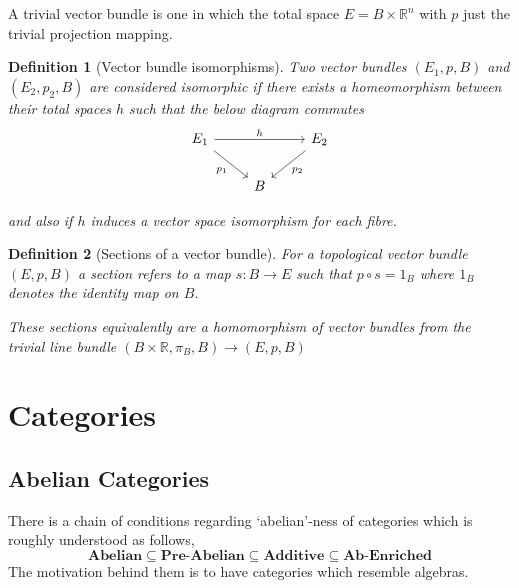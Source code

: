 \documentclass[12pt]{article}
\numberwithin{equation}{section}
\newcommand{\R}{\mathbb{R}}
\newtheorem{definition}{Definition}[section]
\begin{document}
\begin{appendices}
	A trivial vector bundle is one in which the total space $E=B \times \R^n$ with $p$ just the trivial projection mapping.
	
	
	\begin{definition}[Vector bundle isomorphisms]
		Two vector bundles $(E_1,p, B)$ and $(E_2,p_2, B) $ are considered isomorphic if there exists a homeomorphism between their total spaces $h$ such that the below diagram commutes
		\[\begin{tikzcd}
			{E_1} && {E_2} \\
			& B
			\arrow["{p_1}"', from=1-1, to=2-2]
			\arrow["{p_2}", from=1-3, to=2-2]
			\arrow["h", from=1-1, to=1-3]
		\end{tikzcd}\]
		
		and also if $h$ induces a vector space isomorphism for each fibre.
	\end{definition}
	
	\begin{definition}[Sections of a vector bundle]
		For a topological vector bundle $(E,p,B)$ a section refers to a map	$s: B \to E$ such that $p \circ s= 1_B$ where $1_B$ denotes the identity map on $B$.
		
		These sections equivalently are a homomorphism of vector bundles from the trivial line bundle $(B \times \R, \pi_B, B) \to (E,p,B)$
	\end{definition}
%	
%	
%	
	\section{Categories}
	\subsection{Abelian Categories}
	There is a chain of conditions regarding `abelian'-ness of categories which is roughly understood as follows,
	\[ \textbf{Abelian} \subseteq \textbf{Pre-Abelian} \subseteq \textbf{Additive} \subseteq \textbf{Ab-Enriched}\]
	The motivation behind them is to have categories which resemble algebras.
	

\end{appendices}
\end{document}
